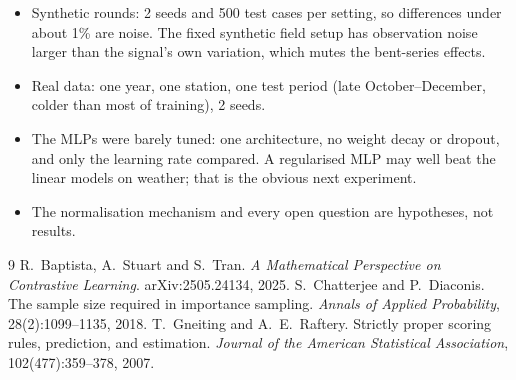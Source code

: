 \documentclass[11pt]{article}
\begin{document}
\begin{itemize}
\item Synthetic rounds: 2 seeds and 500 test cases per setting, so differences under about
  1\% are noise. The fixed synthetic field setup has observation noise larger than the
  signal's own variation, which mutes the bent-series effects.
\item Real data: one year, one station, one test period (late October--December, colder
  than most of training), 2 seeds.
\item The MLPs were barely tuned: one architecture, no weight decay or dropout, and only the
  learning rate compared. A regularised MLP may well beat the linear models on weather; that
  is the obvious next experiment.
\item The normalisation mechanism and every open question are hypotheses, not results.
\end{itemize}

\begin{thebibliography}{9}
 R.~Baptista, A.~Stuart and S.~Tran.
  \emph{A Mathematical Perspective on Contrastive Learning}. arXiv:2505.24134, 2025.
 S.~Chatterjee and P.~Diaconis.
  The sample size required in importance sampling.
  \emph{Annals of Applied Probability}, 28(2):1099--1135, 2018.
 T.~Gneiting and A.~E.~Raftery.
  Strictly proper scoring rules, prediction, and estimation.
  \emph{Journal of the American Statistical Association}, 102(477):359--378, 2007.
\end{thebibliography}
\end{document}
